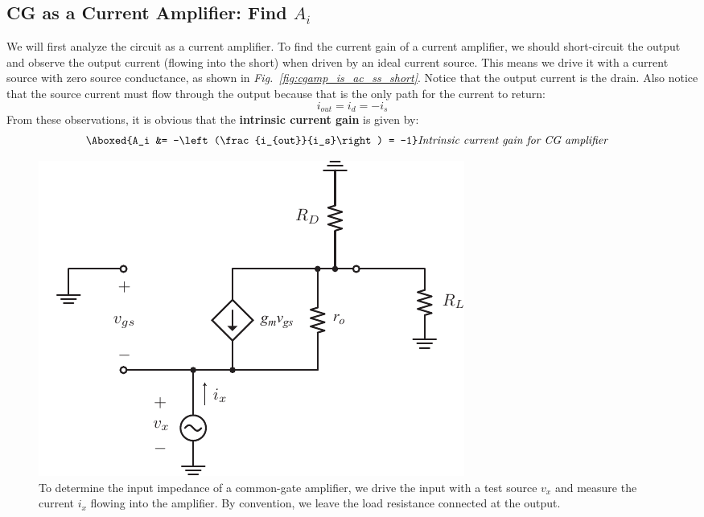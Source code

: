 \subsection{CG as a Current Amplifier\texorpdfstring{: Find $A_{i}$}{}}
We will first analyze the circuit as a current amplifier.  To find the current gain of a current amplifier, we should short-circuit the output and observe the output current (flowing into the short) when driven by an ideal current source.  This means we drive it with a current source with zero source conductance, as shown in \emph{Fig.~\ref{fig:cgamp_is_ac_ss_short}}.  Notice that the output current is the drain.  Also notice that the source current must flow through the output because that is the only path for the current to return:
    \begin{equation}
        i_{out} = i_d =  -i_s
    \end{equation}
From these observations, it is obvious that the \textbf{intrinsic current gain} is given by:
    \begin{align}
        \Aboxed{A_i &=  -\left(\frac{i_{out}}{i_s}\right) = -1} &\textit{Intrinsic current gain for CG amplifier}
    \end{align}
\begin{figure}[t]
\centering
\includegraphics[scale=1.15]{cgamp_is_ac_ss_zin}
\caption{To determine the input impedance of a common-gate amplifier, we drive the input with a test source $v_x$ and measure the current $i_x$ flowing into the amplifier.  By convention, we leave the load resistance connected at the output.}
\label{fig:cgamp_is_ac_ss_zin}
\end{figure}
